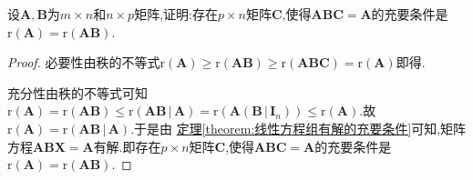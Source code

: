 \documentclass[../../main.tex]{subfiles}%
\begin{document}
\begin{proposition}
设\(\boldsymbol{A},\boldsymbol{B}\)为\(m\times n\)和\(n\times p\)矩阵,证明:存在\(p\times n\)矩阵\(\boldsymbol{C}\),使得\(\boldsymbol{A}\boldsymbol{B}\boldsymbol{C}=\boldsymbol{A}\)的充要条件是\(\mathrm{r}(\boldsymbol{A})=\mathrm{r}(\boldsymbol{A}\boldsymbol{B})\).
\end{proposition}
\begin{proof}

必要性由秩的不等式\(\mathrm{r}(\boldsymbol{A})\geqslant \mathrm{r}(\boldsymbol{A}\boldsymbol{B})\geqslant \mathrm{r}(\boldsymbol{A}\boldsymbol{B}\boldsymbol{C})=\mathrm{r}(\boldsymbol{A})\)即得. 

充分性由秩的不等式可知\(\mathrm{r}\left( \boldsymbol{A} \right) =\mathrm{r}\left( \boldsymbol{AB} \right) \leqslant \mathrm{r}\left( \boldsymbol{AB}\,|\,\boldsymbol{A} \right) =\mathrm{r}\left( \boldsymbol{A}\left( \boldsymbol{B}\,|\,\boldsymbol{I}_n \right) \right) \leqslant \mathrm{r}\left( \boldsymbol{A} \right)\).故$\mathrm{r}\left( \boldsymbol{A} \right) =\mathrm{r}\left( \boldsymbol{AB}\,|\,\boldsymbol{A} \right)$.于是由
\hyperref[theorem:线性方程组有解的充要条件]{定理\ref{theorem:线性方程组有解的充要条件}}可知,矩阵方程$\boldsymbol{ABX}=\boldsymbol{A}$有解.即存在\(p\times n\)矩阵\(\boldsymbol{C}\),使得\(\boldsymbol{A}\boldsymbol{B}\boldsymbol{C}=\boldsymbol{A}\)的充要条件是\(\mathrm{r}(\boldsymbol{A})=\mathrm{r}(\boldsymbol{A}\boldsymbol{B})\).
\end{proof}
\end{document}
